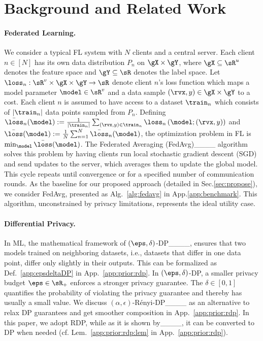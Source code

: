 \section{Background and Related Work}
\label{sec:back}

\paragraph{Federated Learning.}
We consider a typical FL system with $N$ clients and a central server. Each client $n \in [N]$ has its own data distribution $P_n$ on $\gX\times\gY$, where $\gX \subseteq \sR^u$ denotes the feature space and $\gY\subseteq \sR$ denotes the label space. Let $\loss_n:\sR^v \times \gX\times\gY \rightarrow \sR$ denote client $n$'s loss function which maps a model parameter $\model\in \sR^v$ and a data sample $(\rvx,y)\in \gX\times\gY$ to a cost. 
Each client $n$ is assumed to have access to a dataset $\train_n$ which consists of $\left|\train_n\right|$ data points sampled from $P_n$. Defining $\bar{\loss}_n(\model):= \frac{1}{\left| \train_n\right|}\sum_{(\rvx,y)\in \train_n} \loss_n\left(\model;(\rvx,y) \right)$ and $\bar{\loss}(\model) := \frac{1}{N} \sum_{n=1}^N \bar{\loss}_n(\model)$, the optimization problem in FL is $\min_{\model} \bar{\loss}(\model)$. The Federated Averaging (FedAvg)____ algorithm solves this problem by having clients run local stochastic gradient descent (SGD) and send updates to the server, which averages them to update the global model. This cycle repeats until convergence or for a specified number of communication rounds. %
{As the baseline for our proposed approach (detailed in Sec.\ref{sec:propose}), we consider FedAvg, presented as Alg.~\ref{alg:fedavg} in App.\ref{app:benchmark}. This algorithm, unconstrained by privacy limitations, represents the ideal utility case.}


\paragraph{Differential Privacy.}
In ML, the mathematical framework of $(\eps,\delta)$-DP____, ensures that two models trained on neighboring datasets, i.e., datasets that differ in one data point, differ only slightly in their outputs. %
{This can be formalized as Def.~\ref{app:epsdeltaDP} in App.~\ref{app:prior:rdp}.} 
In $(\eps,\delta)$-DP, a smaller privacy budget $\eps \in \sR_{+}$ enforces a stronger privacy guarantee. The $\delta\in [0,1]$ quantifies the probability of violating the privacy guarantee and thereby has usually a small value. 
We discuss $(\alpha, \epsilon)$-Rényi-DP____ as an alternative to relax DP guarantees and get smoother composition in App.~\ref{app:prior:rdp}. In this paper, we adopt RDP, while as it is shown by____, it can be converted to DP when needed (cf. Lem.~\ref{app:prior:rdp:lem} in App.~\ref{app:prior:rdp}). 


